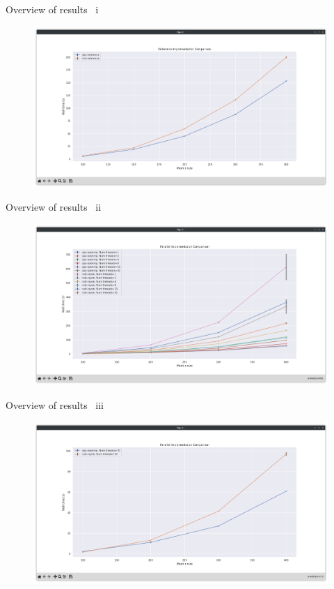\documentclass[10pt,aspectratio=169]{beamer}
\begin{document}
\begin{frame}{Overview of results \ i}
    \begin{figure}[h]
        \centering
        \includegraphics[width=\textwidth]{images/backup_screenshots/reference_line.png}
        \label{fig:reference_line}
    \end{figure}
\end{frame}
\begin{frame}{Overview of results \ ii}
    \begin{figure}[h]
        \centering
        \includegraphics[width=\textwidth]{images/backup_screenshots/parallel_line_all.png}
        \label{fig:reference_line}
    \end{figure}
\end{frame}
\begin{frame}{Overview of results \ iii}
    \begin{figure}[h]
        \centering
        \includegraphics[width=\textwidth]{images/backup_screenshots/parallel_line.png}
        \label{fig:reference_line}
    \end{figure}
\end{frame}
\end{document}
